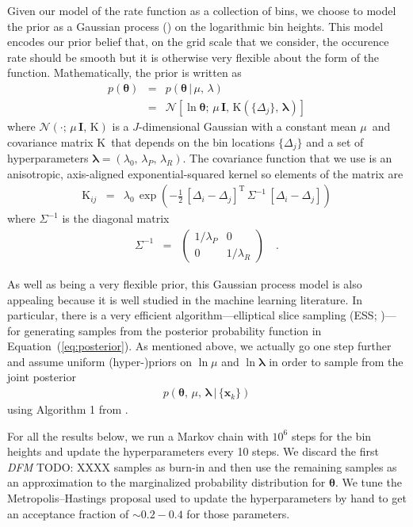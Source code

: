 \documentclass[12pt,preprint]{aastex}
\newcommand{\Eq}[1]{Equation~(\ref{eq:#1})}
\newcommand{\eq}[1]{\Eq{#1}}
\newcommand{\bvec}[1]{\ensuremath{\boldsymbol{#1}}}
\newcommand{\todo}[3]{{\color{#2} \emph{#1} TODO: #3}}
\newcommand{\dfmtodo}[1]{\todo{DFM}{red}{#1}}
\newcommand{\ratepar}{{\ensuremath{\theta}}}
\newcommand{\ratepars}{{\ensuremath{\bvec{\ratepar}}}}
\newcommand{\radius}{\ensuremath{R}}
\newcommand{\period}{\ensuremath{P}}
\newcommand{\data}{{\ensuremath{\bvec{x}}}}
\newcommand{\binarea}{{\ensuremath{\Delta}}}
\newcommand{\mean}{{\ensuremath{\mu}}}
\newcommand{\smooth}{{\ensuremath{\lambda}}}
\newcommand{\smoothpars}{{\ensuremath{\bvec{\smooth}}}}
\newcommand{\cov}{{\ensuremath{\mathrm{K}}}}
\begin{document}
Given our model of the rate function as a collection of bins, we choose to
model the prior as a Gaussian process (\citealt{gp,gibson-gp}) on the
logarithmic bin heights.
This model encodes our prior belief that, on the grid scale that we consider,
the occurence rate should be smooth but it is otherwise very flexible about
the form of the function.
Mathematically, the prior is written as
\begin{eqnarray}
p(\ratepars) &=& p(\ratepars\,|\,\mean,\,\smooth) \\
&=& \mathcal{N} \left[\ln\ratepars;\,\mean\,\bvec{I},\,
\cov(\{\binarea_j\},\,\smoothpars)\right]
\end{eqnarray}
where $\mathcal{N}(\cdot;\,\mean\,\bvec{I},\,\cov)$ is a $J$-dimensional
Gaussian with a constant mean \mean\ and covariance matrix \cov\ that depends
on the bin locations $\{\binarea_j\}$ and a set of hyperparameters
$\smoothpars = (\smooth_0,\,\smooth_\period,\,\smooth_\radius)$.
The covariance function that we use is an anisotropic, axis-aligned
exponential-squared kernel so elements of the matrix are
\begin{eqnarray}
\cov_{ij} &=& \smooth_0\,\exp\left(-\frac{1}{2}\,
    [\binarea_i-\binarea_j]^\mathrm{T}\,\Sigma^{-1}\,[\binarea_i-\binarea_j]
\right)
\end{eqnarray}
where $\Sigma^{-1}$ is the diagonal matrix
\begin{eqnarray}
\Sigma^{-1} &=& \left(\begin{array}{cc}
1/\smooth_\period & 0 \\
0 & 1/\smooth_\radius
\end{array}\right) \quad.
\end{eqnarray}

As well as being a very flexible prior, this Gaussian process model is also
appealing because it is well studied in the machine learning literature.
In particular, there is a very efficient algorithm---elliptical slice sampling
(ESS; \citealt{ess})---for generating samples from the posterior probability
function in \eq{posterior}.
As mentioned above, we actually go one step further and assume uniform
(hyper-)priors on $\ln\mean$ and $\ln\smoothpars$ in order to sample from the
joint posterior
\begin{eqnarray}
p(\ratepars,\,\mean,\,\smoothpars\,|\,\{\data_k\})
\end{eqnarray}
using Algorithm 1 from \citet{ess-hyper}.

For all the results below, we run a Markov chain with $10^6$ steps for the bin
heights and update the hyperparameters every 10 steps.
We discard the first \dfmtodo{XXXX} samples as burn-in and then use the
remaining samples as an approximation to the marginalized probability
distribution for \ratepars.
We tune the Metropolis--Hastings proposal used to update the hyperparameters
by hand to get an acceptance fraction of $\sim0.2-0.4$ for those parameters.
\end{document}
